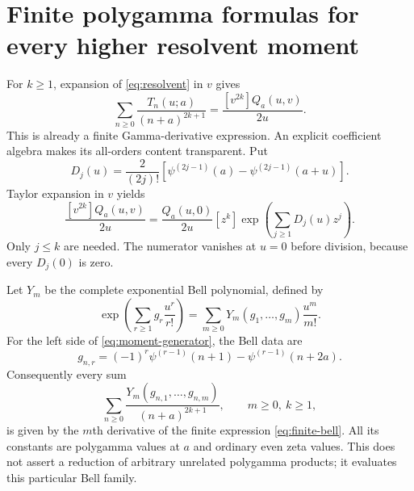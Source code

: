 \documentclass[11pt,a4paper]{article}
\numberwithin{equation}{section}
\theoremstyle{definition}\newtheorem{definition}[theorem]{Definition}
\theoremstyle{remark}\newtheorem{remark}[theorem]{Remark}
\begin{document}
\section{Finite polygamma formulas for every higher resolvent moment}
\label{sec:polygamma}
For $k\ge1$, expansion of \eqref{eq:resolvent} in $v$ gives
\begin{equation}
 \sum_{n\ge0}\frac{T_n(u;a)}{(n+a)^{2k+1}}
 =\frac{[v^{2k}]Q_a(u,v)}{2u}.
 \label{eq:moment-generator}
\end{equation}
This is already a finite Gamma-derivative expression. An explicit
coefficient algebra makes its all-orders content transparent. Put
\begin{equation}
 D_j(u)=\frac{2}{(2j)!}
             [\psi^{(2j-1)}(a)-\psi^{(2j-1)}(a+u)].
 \label{eq:Dj}
\end{equation}
Taylor expansion in $v$ yields
\begin{equation}
 \frac{[v^{2k}]Q_a(u,v)}{2u}
 =\frac{Q_a(u,0)}{2u}[z^k]
       \exp\left(\sum_{j\ge1}D_j(u)z^j\right).
 \label{eq:finite-bell}
\end{equation}
Only $j\le k$ are needed. The numerator vanishes at $u=0$ before
division, because every $D_j(0)$ is zero.

Let $Y_m$ be the complete exponential Bell polynomial, defined by
\[
 \exp\left(\sum_{r\ge1}g_r\frac{u^r}{r!}\right)
       =\sum_{m\ge0}Y_m(g_1,\ldots,g_m)\frac{u^m}{m!}.
\]
For the left side of \eqref{eq:moment-generator}, the Bell data are
\begin{equation}
 g_{n,r}=(-1)^r\psi^{(r-1)}(n+1)-\psi^{(r-1)}(n+2a).
 \label{eq:gnr}
\end{equation}
Consequently every sum
\begin{equation}
 \sum_{n\ge0}\frac{Y_m(g_{n,1},\ldots,g_{n,m})}{(n+a)^{2k+1}},
 \qquad m\ge0,\ k\ge1,
 \label{eq:bell-moment}
\end{equation}
is given by the $m$th derivative of the finite expression
\eqref{eq:finite-bell}. All its constants are polygamma values at $a$
and ordinary even zeta values. This does not assert a reduction of
arbitrary unrelated polygamma products; it evaluates this particular
Bell family.
\end{document}
